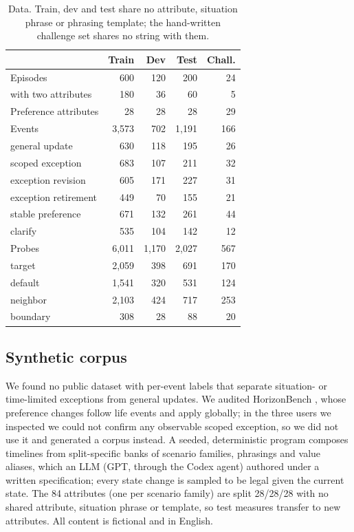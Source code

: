 \documentclass[11pt]{article}
\begin{document}
\begin{table}[t]
\centering\small
\setlength{\tabcolsep}{4pt}
\begin{tabular}{@{}lrrrr@{}}
\toprule
 & Train & Dev & Test & Chall. \\
\midrule
Episodes & 600 & 120 & 200 & 24 \\
\quad with two attributes & 180 & 36 & 60 & 5 \\
Preference attributes & 28 & 28 & 28 & 29 \\
Events & 3,573 & 702 & 1,191 & 166 \\
\quad general update & 630 & 118 & 195 & 26 \\
\quad scoped exception & 683 & 107 & 211 & 32 \\
\quad exception revision & 605 & 171 & 227 & 31 \\
\quad exception retirement & 449 & 70 & 155 & 21 \\
\quad stable preference & 671 & 132 & 261 & 44 \\
\quad clarify & 535 & 104 & 142 & 12 \\
Probes & 6,011 & 1,170 & 2,027 & 567 \\
\quad target & 2,059 & 398 & 691 & 170 \\
\quad default & 1,541 & 320 & 531 & 124 \\
\quad neighbor & 2,103 & 424 & 717 & 253 \\
\quad boundary & 308 & 28 & 88 & 20 \\
\bottomrule
\end{tabular}
\caption{Data. Train, dev and test share no attribute, situation phrase or phrasing template; the hand-written challenge set shares no string with them.}
\label{tab:data}
\end{table}

\subsection{Synthetic corpus}
We found no public dataset with per-event labels that separate situation- or time-limited exceptions from general updates. We audited HorizonBench \citep{li2026horizonbench}, whose preference changes follow life events and apply globally; in the three users we inspected we could not confirm any observable scoped exception, so we did not use it and generated a corpus instead. A seeded, deterministic program composes timelines from split-specific banks of scenario families, phrasings and value aliases, which an LLM (GPT, through the Codex agent) authored under a written specification; every state change is sampled to be legal given the current state. The 84 attributes (one per scenario family) are split 28/28/28 with no shared attribute, situation phrase or template, so test measures transfer to new attributes. All content is fictional and in English.
\end{document}
